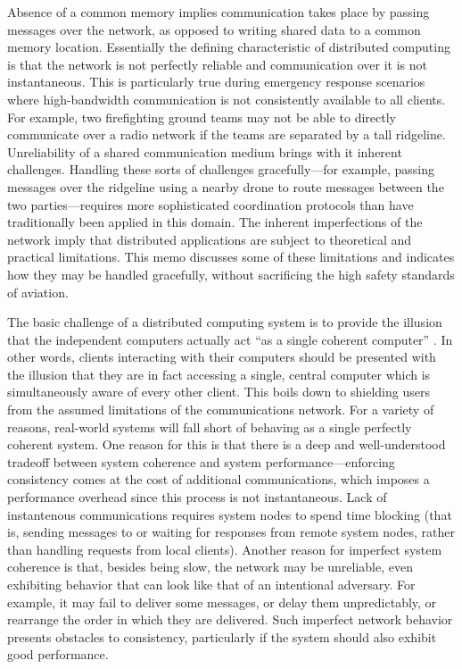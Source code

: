 Absence of a common memory implies communication takes place by
passing messages over the network, as opposed to writing shared data
to a common memory location. Essentially the defining characteristic
of distributed computing is that the network is not perfectly reliable
and communication over it is not instantaneous. This is particularly
true during emergency response scenarios where high-bandwidth
communication is not consistently available to all clients. For
example, two firefighting ground teams may not be able to directly
communicate over a radio network if the teams are separated by a tall
ridgeline. Unreliability of a shared communication medium brings with
it inherent challenges. Handling these sorts of challenges
gracefully---for example, passing messages over the ridgeline using a
nearby drone to route messages between the two parties---requires more
sophisticated coordination protocols than have traditionally been
applied in this domain. The inherent imperfections of the network
imply that distributed applications are subject to theoretical and
practical limitations. This memo discusses some of these limitations
and indicates how they may be handled gracefully, without sacrificing
the high safety standards of aviation.

The basic challenge of a distributed computing system is to provide
the illusion that the independent computers actually act ``as a single
coherent computer'' \cite{TanenbaumSteen07}. In other words, clients
interacting with their computers should be presented with the illusion
that they are in fact accessing a single, central computer which is
simultaneously aware of every other client. This boils down to
shielding users from the assumed limitations of the communications
network. For a variety of reasons, real-world systems will fall short
of behaving as a single perfectly coherent system. One reason for this
is that there is a deep and well-understood tradeoff between system
coherence and system performance---enforcing consistency comes at the
cost of additional communications, which imposes a performance
overhead since this process is not instantaneous. Lack of instantenous
communications requires system nodes to spend time blocking (that is,
sending messages to or waiting for responses from remote system nodes,
rather than handling requests from local clients). Another reason for
imperfect system coherence is that, besides being slow, the network
may be unreliable, even exhibiting behavior that can look like that of
an intentional adversary. For example, it may fail to deliver some
messages, or delay them unpredictably, or rearrange the order in which
they are delivered. Such imperfect network behavior presents obstacles
to consistency, particularly if the system should also exhibit good
performance.

